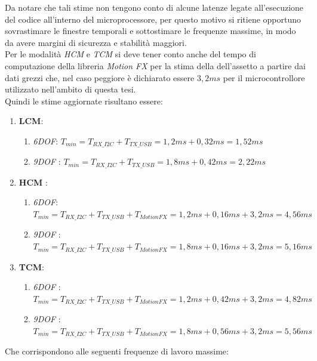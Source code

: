  Da notare che tali stime non tengono conto di alcune latenze legate all'esecuzione del codice all'interno del microprocessore, per questo motivo si ritiene opportuno sovrastimare le finestre temporali e sottostimare le frequenze massime, in modo da avere margini di sicurezza e stabilità maggiori.\\
Per le modalità \textit{HCM} e \textit{TCM} si deve tener conto anche del tempo di computazione della libreria \textit{Motion FX} per la stima della dell'assetto a partire dai dati grezzi che, nel caso peggiore è dichiarato essere $3,2 ms$ \cite{motion} per il microcontrollore utilizzato nell'ambito di questa tesi.\\
Quindi le stime aggiornate risultano essere:
\begin{enumerate}
	\item \textbf{LCM}:
	\begin{enumerate}
		\item \textit{6DOF}: $T_{min} = T_{RX\_I2C} + T_{TX\_USB} = 1,2 ms + 0,32 ms = 1,52 ms $
		\item \textit{9DOF} : $ T_{min} = T_{RX\_I2C} + T_{TX\_USB} = 1,8 ms + 0,42 ms = 2,22 ms $
	\end{enumerate}
	\item \textbf{HCM} :
	\begin{enumerate}
		\item \textit{6DOF}: $T_{min} = T_{RX\_I2C} + T_{TX\_USB} + T_{MotionFX}  = 1,2 ms + 0,16 ms + 3,2ms = 4,56 ms $
		\item \textit{9DOF} : $ T_{min} = T_{RX\_I2C} + T_{TX\_USB} + T_{MotionFX} = 1,8 ms + 0,16 ms + 3,2ms = 5,16 ms $
	\end{enumerate}
	\item \textbf{TCM}:
	\begin{enumerate}
		\item \textit{6DOF} : $ T_{min} = T_{RX\_I2C} + T_{TX\_USB} + T_{MotionFX} = 1,2 ms + 0,42 ms + 3,2ms = 4,82 ms $
		\item \textit{9DOF} : $T_{min} = T_{RX\_I2C} + T_{TX\_USB} + T_{MotionFX} = 1,8 ms + 0,56 ms + 3,2 ms = 5,56 ms $
	\end{enumerate}
\end{enumerate}

 
Che corrispondono alle seguenti frequenze di lavoro massime:


